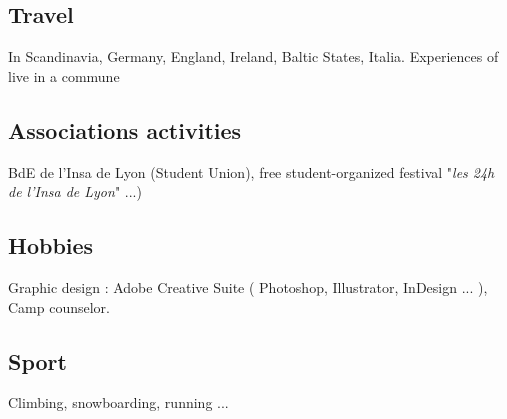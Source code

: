 	\subsection{Travel}
		{In Scandinavia, Germany, England, Ireland, Baltic States, Italia. Experiences of live in a commune}
		
	\subsection{Associations activities}
		{BdE de l'Insa de Lyon (Student Union), free student-organized festival "\textit{les 24h de l'Insa de Lyon}" ...)}
		
	\subsection{Hobbies}
		{Graphic design : Adobe Creative Suite ( Photoshop, Illustrator, InDesign ... ),\\Camp counselor.}
		
	\subsection{Sport}
		{Climbing, snowboarding, running ...}
		
